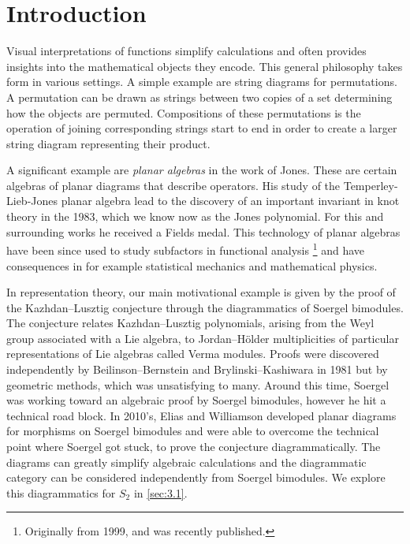 \chapter{Introduction}

Visual interpretations of functions simplify calculations and often provides insights into the mathematical objects they encode.  This general philosophy takes form in various settings. A simple example are string diagrams for permutations. A permutation can be drawn as strings between two copies of a set determining how the objects are permuted. Compositions of these permutations is the operation of joining corresponding strings start to end in order to create a larger string diagram representing their product. 

A significant example are \textit{planar algebras} in the work of Jones. These are certain algebras of planar diagrams that describe operators. His study of the Temperley-Lieb-Jones planar algebra lead to the discovery of an important invariant in knot theory in the 1983, which we know now as the Jones polynomial. For this and surrounding works he received a Fields medal. This technology of planar algebras have been since used to study subfactors in functional analysis \cite{jones-planar-algebra}\footnote{Originally from 1999, and was recently published.} and have consequences in for example statistical mechanics and mathematical physics.

In representation theory, our main motivational example is given by the proof of the Kazhdan--Lusztig conjecture through the diagrammatics of Soergel bimodules. The conjecture relates Kazhdan--Lusztig polynomials, arising from the Weyl group associated with a Lie algebra, to Jordan--H\"older multiplicities of particular representations of Lie algebras called Verma modules. Proofs were discovered independently by Beilinson--Bernstein and Brylinski--Kashiwara in 1981 but by geometric methods, which was unsatisfying to many. Around this time, Soergel was working toward an algebraic proof by Soergel bimodules, however he hit a technical road block. In 2010's, Elias and Williamson  developed planar diagrams for morphisms on Soergel bimodules and were able to overcome the technical point where Soergel got stuck, to prove the conjecture diagrammatically. The diagrams can greatly simplify algebraic calculations and the diagrammatic category can be considered independently from Soergel bimodules. We explore this diagrammatics for $S_2$ in \autoref{sec:3.1}.

